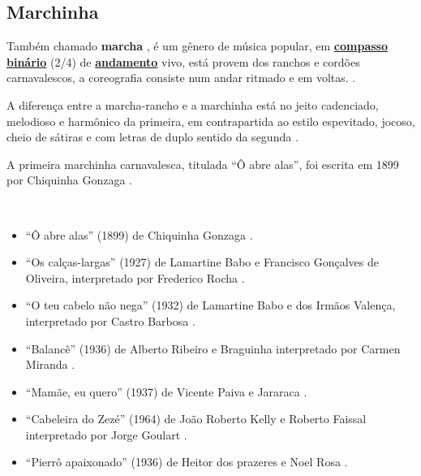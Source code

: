 \subsection{Marchinha} 
\label{subsec:marcha}
Também chamado \textbf{marcha} \cite[pp. 448]{marcondes1977enciclopedia},
é um gênero de música popular, em \hyperref[subsec:compassobinario]{\textbf{compasso binário}} (2/4) de \hyperref[sec:Andamento]{\textbf{andamento}} vivo, 
está provem dos ranchos e cordões carnavalescos, a coreografia consiste num andar ritmado e em voltas. \cite[pp. 65]{reinato2010musica}.

A diferença entre a marcha-rancho e  a marchinha está no jeito cadenciado, 
melodioso e harmônico da primeira, em contrapartida ao estilo espevitado,
jocoso, cheio de sátiras e com letras de duplo sentido da segunda \cite[pp. 84,87]{diniz2008almanaque}.

A primeira marchinha carnavalesca, titulada ``Ô abre alas'', foi escrita em 1899 por Chiquinha Gonzaga \cite[pp. 84, 239]{diniz2008almanaque}.

\begin{example} ~

\begin{itemize}
\item ``Ô abre alas'' (1899) de Chiquinha Gonzaga  \cite[pp. 84, 239]{diniz2008almanaque}.
\item ``Os calças-largas'' (1927) de Lamartine Babo e Francisco Gonçalves de Oliveira,
interpretado por Frederico Rocha \cite[pp. 91]{diniz2008almanaque}.
\item ``O teu cabelo não nega'' (1932) de Lamartine Babo e dos Irmãos Valença, interpretado por Castro Barbosa \cite[pp. 99]{diniz2008almanaque}.
\item ``Balancê'' (1936) de Alberto Ribeiro e Braguinha interpretado por Carmen Miranda \cite[pp. 83]{diniz2008almanaque}.
\item ``Mamãe, eu quero'' (1937) de Vicente Paiva e Jararaca \cite[pp. 584]{marcondes1977enciclopediav2} \cite[pp. 93]{diniz2008almanaque}.
\item ``Cabeleira do Zezé'' (1964) de João Roberto Kelly e Roberto Faissal interpretado por Jorge Goulart \cite[pp. 117,118]{diniz2008almanaque}.
\item ``Pierrô apaixonado'' (1936) de Heitor dos prazeres e Noel Rosa \cite[pp. 1070]{marcondes1977enciclopediav2} \cite[pp. 53]{diniz2008almanaque}.
\end{itemize}
\end{example}

